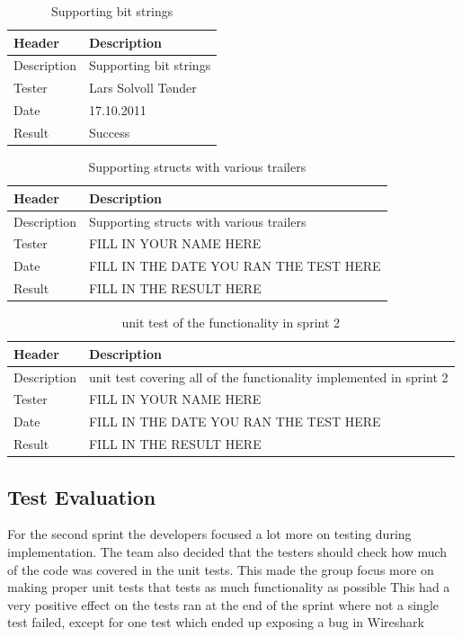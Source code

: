 \begin{table}[!htb] \footnotesize \center
\caption{ Supporting bit strings \label{tab:sp2TID12}}
\begin{tabular}{l l}
	\toprule
	Header & Description \\
	\midrule
	Description & Supporting bit strings \\
	Tester & Lars Solvoll Tønder \\
	Date & 17.10.2011 \\
	Result & Success\\
	\bottomrule
\end{tabular}
\end{table}

\begin{table}[!htb] \footnotesize \center
\caption{Supporting structs with various trailers \label{tab:sp2TID13}}
\begin{tabular}{l l}
	\toprule
	Header & Description \\
	\midrule
	Description & Supporting structs with various trailers \\
	Tester & FILL IN YOUR NAME HERE \\
	Date & FILL IN THE DATE YOU RAN THE TEST HERE \\
	Result & FILL IN THE RESULT HERE\\
	\bottomrule
\end{tabular}
\end{table}

\begin{table}[!htb] \footnotesize \center
\caption{unit test of the functionality in sprint 2\label{tab:sp2TID14}}
\begin{tabular}{l l}
	\toprule
	Header & Description \\
	\midrule
	Description & unit test covering all of the functionality implemented in sprint 2 \\
	Tester & FILL IN YOUR NAME HERE \\
	Date & FILL IN THE DATE YOU RAN THE TEST HERE \\
	Result & FILL IN THE RESULT HERE\\
	\bottomrule
\end{tabular}
\end{table}

\subsection{Test Evaluation}
For the second sprint the developers focused a lot more on testing during implementation. The team also decided that the testers should check how much of the code was covered in the unit tests. This made the group focus more on making proper unit tests that tests as much functionality as possible This had a very positive effect on the tests ran at the end of the sprint where not a single test failed, except for one test which ended up exposing a bug in Wireshark

